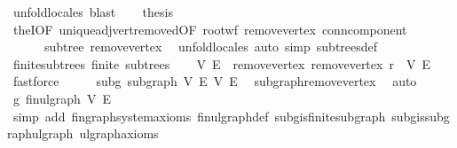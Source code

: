 \begin{isabellebody}
\ {\isacharparenleft}{\kern0pt}unfold{\isacharunderscore}{\kern0pt}locales{\isacharcomma}{\kern0pt}\ blast{\isacharparenright}{\kern0pt}\isanewline
\ \ \isamarkupfalse%
\ {\isacharquery}{\kern0pt}thesis\ \isamarkupfalse%
\ theI{\isacharprime}{\kern0pt}{\isacharbrackleft}{\kern0pt}OF\ unique{\isacharunderscore}{\kern0pt}adj{\isacharunderscore}{\kern0pt}vert{\isacharunderscore}{\kern0pt}removed{\isacharbrackleft}{\kern0pt}OF\ root{\isacharunderscore}{\kern0pt}wf\ remove{\isacharunderscore}{\kern0pt}vertex\ conn{\isacharunderscore}{\kern0pt}component{\isacharbrackright}{\kern0pt}{\isacharbrackright}{\kern0pt}\isanewline
\ \ \ \ \ \ subtree\ remove{\isacharunderscore}{\kern0pt}vertex\ \isamarkupfalse%
\ unfold{\isacharunderscore}{\kern0pt}locales\ {\isacharparenleft}{\kern0pt}auto\ simp{\isacharcolon}{\kern0pt}\ subtrees{\isacharunderscore}{\kern0pt}def{\isacharparenright}{\kern0pt}\isanewline
{}\isamarkupfalse%
%
\endisatagproof
{\isafoldproof}%
%
\isadelimproof
\isanewline
%
\endisadelimproof
\isanewline
{}\isamarkupfalse%
\ finite{\isacharunderscore}{\kern0pt}subtrees{\isacharcolon}{\kern0pt}\ {\isachardoublequoteopen}finite\ subtrees{\isachardoublequoteclose}\isanewline
%
\isadelimproof
%
\endisadelimproof
%
\isatagproof
{}\isamarkupfalse%
{\isacharminus}{\kern0pt}\isanewline
\ \ \isamarkupfalse%
\ V{\isacharprime}{\kern0pt}\ E{\isacharprime}{\kern0pt}\ \ remove{\isacharunderscore}{\kern0pt}vertex{\isacharcolon}{\kern0pt}\ {\isachardoublequoteopen}remove{\isacharunderscore}{\kern0pt}vertex\ r\ {\isacharequal}{\kern0pt}\ {\isacharparenleft}{\kern0pt}V{\isacharprime}{\kern0pt}{\isacharcomma}{\kern0pt}\ E{\isacharprime}{\kern0pt}{\isacharparenright}{\kern0pt}{\isachardoublequoteclose}\ \isamarkupfalse%
\ fastforce\isanewline
\ \ \isamarkupfalse%
\ \isamarkupfalse%
\ subg{\isacharcolon}{\kern0pt}\ subgraph\ V{\isacharprime}{\kern0pt}\ E{\isacharprime}{\kern0pt}\ V\ E\ \isamarkupfalse%
\ subgraph{\isacharunderscore}{\kern0pt}remove{\isacharunderscore}{\kern0pt}vertex\ \isamarkupfalse%
\ auto\isanewline
\ \ \isamarkupfalse%
\ g{\isacharprime}{\kern0pt}{\isacharcolon}{\kern0pt}\ fin{\isacharunderscore}{\kern0pt}ulgraph\ V{\isacharprime}{\kern0pt}\ E{\isacharprime}{\kern0pt}\isanewline
\ \ \ \ \isamarkupfalse%
\ {\isacharparenleft}{\kern0pt}simp\ add{\isacharcolon}{\kern0pt}\ fin{\isacharunderscore}{\kern0pt}graph{\isacharunderscore}{\kern0pt}system{\isacharunderscore}{\kern0pt}axioms\ fin{\isacharunderscore}{\kern0pt}ulgraph{\isacharunderscore}{\kern0pt}def\ subg{\isachardot}{\kern0pt}is{\isacharunderscore}{\kern0pt}finite{\isacharunderscore}{\kern0pt}subgraph\ subg{\isachardot}{\kern0pt}is{\isacharunderscore}{\kern0pt}subgraph{\isacharunderscore}{\kern0pt}ulgraph\ ulgraph{\isacharunderscore}{\kern0pt}axioms{\isacharparenright}{\kern0pt}\isanewline

\end{isabellebody}
